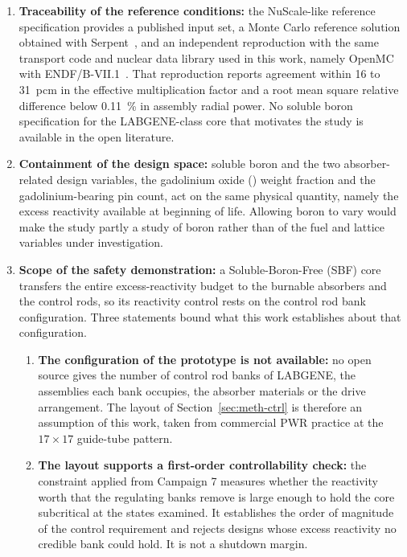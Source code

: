 \begin{enumerate}
  \item \textbf{Traceability of the reference conditions:} the
        NuScale-like reference specification provides a published
        input set, a
        Monte Carlo reference solution obtained with
        Serpent~\cite{fridman_nuscale_benchmark_2023}, and an
        independent reproduction with the same transport code and
        nuclear data library used in this work, namely OpenMC with
        ENDF/B-VII.1~\cite{ez_aldeen_2025}. That
        reproduction reports agreement within 16 to \SI{31}{pcm} in the
        effective multiplication factor and a root mean square relative
        difference below \SI{0.11}{\percent} in assembly radial power.
        No soluble boron specification for the LABGENE-class core that
        motivates the study is available in the open literature.
  \item \textbf{Containment of the design space:} soluble boron and the
        two absorber-related design variables, the gadolinium oxide
        () weight fraction and the gadolinium-bearing pin
        count, act on the same physical quantity, namely the excess
        reactivity available at beginning of life. Allowing boron to
        vary would make the study partly a study of boron rather than
        of the fuel and lattice variables under investigation.
  \item \textbf{Scope of the safety demonstration:} a
        Soluble-Boron-Free (SBF) core transfers the entire
        excess-reactivity budget to the burnable absorbers and the
        control rods, so its reactivity control rests on the control
        rod bank configuration. Three statements bound what this work
        establishes about that configuration.

        \begin{enumerate}[label=\theenumi.\arabic*, ref=\theenumi.\arabic*]
          \item \textbf{The configuration of the prototype is not
                available:} no open source gives the number of control
                rod banks of LABGENE, the assemblies each bank occupies,
                the absorber materials or the drive arrangement. The
                layout of Section~\ref{sec:meth-ctrl} is therefore an
                assumption of this work, taken from commercial PWR
                practice at the $17\times17$ guide-tube pattern.

          \item \textbf{The layout supports a first-order
                controllability check:} the constraint applied from
                Campaign 7 measures whether the reactivity worth that
                the regulating banks remove is large enough to hold the
                core subcritical at the states examined. It establishes
                the order of magnitude of the control requirement and
                rejects designs whose excess reactivity no credible bank
                could hold. It is not a shutdown margin.


\end{enumerate}
\end{enumerate}
